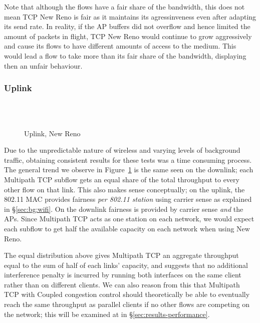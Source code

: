 Note that although the flows have a fair share of the bandwidth, this does not 
mean TCP New Reno is fair as it maintains its agressinveness even after adapting 
its send rate. In reality, if the AP buffers did not overflow and hence limited 
the amount of packets in flight, TCP New Reno would continue to grow 
aggressively and cause its flows to have different amounts of access to the 
medium. This would lead a flow to take more than its fair share of the 
bandwidth, displaying then an unfair behaviour.  

\subsubsection{Uplink}
\label{sec:results-mptcp-up}

\begin{figure}[h]
  \centering
  \\
  \subfloat[][2.4 GHz, non-overlapping channels] {\
    \scalebox{0.70}{}\label{graph:cc-reno-up}
  }
  \\
  \subfloat[][5 and 2.4 GHz] {\
    \scalebox{0.70}{}\label{graph:cb-reno-up}
  }
  \caption{Uplink, New Reno}\label{graph:reno-up}
\end{figure}

Due to the unpredictable nature of wireless and varying levels of background
traffic, obtaining consistent results for these tests was a time consuming
process. The general trend we observe in Figure~\ref{graph:reno-up} is the
same seen on the downlink; each Multipath TCP subflow gets an equal
share of the total throughput to every other flow on that link. This also makes
sense conceptually; on the uplink, the 802.11 MAC provides fairness
\emph{per 802.11 station} using carrier sense as explained in
\S\ref{sec:bg:wifi}. On the downlink fairness is provided by carrier sense
\emph{and} the APs. Since Multipath TCP acts as one station on each network,
we would expect each subflow to get half the available capacity on each network
when using New Reno.

The equal distribution above gives Multipath TCP an aggregate throughput equal
to the sum of half of each links' capacity, and suggests that no additional interference
penalty is incurred by running both interfaces on the same client rather than on
different clients. We can also reason from this that Multipath TCP with Coupled
congestion control should theoretically be able to eventually reach the same
throughput as parallel clients if no other flows are competing on the network; 
this will be examined at in \S\ref{sec:results-performance}.

